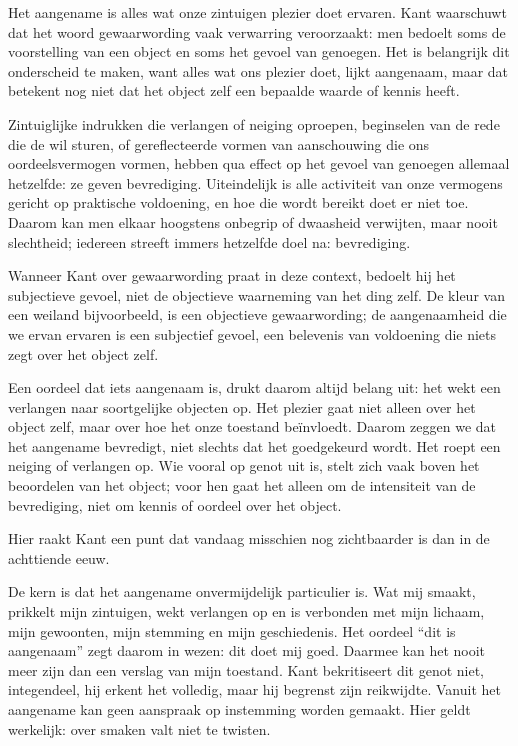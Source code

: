 \begin{mdframed}[leftmargin=0pt,rightmargin=0pt,backgroundcolor=blue!6,linecolor=white,innertopmargin=6pt,innerbottommargin=6pt]

Het aangename is alles wat onze zintuigen plezier doet ervaren. Kant waarschuwt dat het woord gewaarwording vaak verwarring veroorzaakt: men bedoelt soms de voorstelling van een object en soms het gevoel van genoegen. Het is belangrijk dit onderscheid te maken, want alles wat ons plezier doet, lijkt aangenaam, maar dat betekent nog niet dat het object zelf een bepaalde waarde of kennis heeft.

Zintuiglijke indrukken die verlangen of neiging oproepen, beginselen van de rede die de wil sturen, of gereflecteerde vormen van aanschouwing die ons oordeelsvermogen vormen, hebben qua effect op het gevoel van genoegen allemaal hetzelfde: ze geven bevrediging. Uiteindelijk is alle activiteit van onze vermogens gericht op praktische voldoening, en hoe die wordt bereikt doet er niet toe. Daarom kan men elkaar hoogstens onbegrip of dwaasheid verwijten, maar nooit slechtheid; iedereen streeft immers hetzelfde doel na: bevrediging.

Wanneer Kant over gewaarwording praat in deze context, bedoelt hij het subjectieve gevoel, niet de objectieve waarneming van het ding zelf. De kleur van een weiland bijvoorbeeld, is een objectieve gewaarwording; de aangenaamheid die we ervan ervaren is een subjectief gevoel, een belevenis van voldoening die niets zegt over het object zelf.

Een oordeel dat iets aangenaam is, drukt daarom altijd belang uit: het wekt een verlangen naar soortgelijke objecten op. Het plezier gaat niet alleen over het object zelf, maar over hoe het onze toestand beïnvloedt. Daarom zeggen we dat het aangename bevredigt, niet slechts dat het goedgekeurd wordt. Het roept een neiging of verlangen op. Wie vooral op genot uit is, stelt zich vaak boven het beoordelen van het object; voor hen gaat het alleen om de intensiteit van de bevrediging, niet om kennis of oordeel over het object.

\bigskip
Hier raakt Kant een punt dat vandaag misschien nog zichtbaarder is dan in de achttiende eeuw.

De kern is dat het aangename onvermijdelijk particulier is. 
Wat mij smaakt, prikkelt mijn zintuigen, wekt verlangen op en is verbonden met mijn lichaam, mijn gewoonten, mijn stemming en mijn geschiedenis. 
Het oordeel “dit is aangenaam” zegt daarom in wezen: dit doet mij goed. Daarmee kan het nooit meer zijn dan een verslag van mijn toestand. 
Kant bekritiseert dit genot niet, integendeel, hij erkent het volledig, maar hij begrenst zijn reikwijdte. 
Vanuit het aangename kan geen aanspraak op instemming worden gemaakt. Hier geldt werkelijk: over smaken valt niet te twisten.


\end{mdframed}
